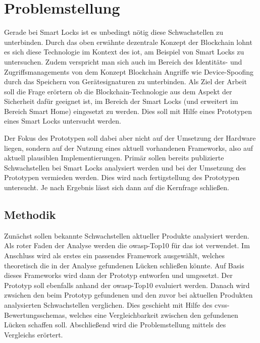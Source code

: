 \section*{Problemstellung}
    Gerade bei Smart Locks ist es unbedingt nötig diese Schwachstellen zu unterbinden.
    Durch das oben erwähnte dezentrale Konzept der Blockchain\cite{Nakamoto2008} lohnt es sich diese Technologie im Kontext des \gls{iot}, am Beispiel von Smart Locks zu untersuchen.
    Zudem verspricht man sich auch im Bereich des Identitäts- und Zugriffsmanagements von dem Konzept Blockchain Angriffe wie Device-Spoofing durch das Speichern von Gerätesignaturen zu unterbinden\cite{Kshetri2017}.
    \newline
    \noindent Als Ziel der Arbeit soll die Frage erörtern ob die Block\-chain\--Tech\-no\-lo\-gie aus dem Aspekt der Sicherheit dafür geeignet ist, im Bereich der Smart Locks (und erweitert im Bereich Smart Home) eingesetzt zu werden.
    Dies soll mit Hilfe eines Prototypen eines Smart Locks untersucht werden.
    
    Der Fokus des Prototypen soll dabei aber nicht auf der Umsetzung der Hardware liegen, sondern auf der Nutzung eines aktuell vorhandenen Frameworks, also auf aktuell plausiblen Implementierungen. 
    Primär sollen bereits publizierte Schwachstellen bei Smart Locks analysiert werden und bei der Umsetzung des Prototypen vermieden werden. 
    Dies wird nach fertigstellung des Prototypen untersucht.
    Je nach Ergebnis lässt sich dann auf die Kernfrage schließen.

    \subsection*{Methodik}
        Zunächst sollen bekannte Schwachstellen aktueller Produkte analysiert werden.
        Als roter Faden der Analyse werden die \gls{owasp}-Top10 für das \gls{iot}\cite{Miessler2015a} verwendet.
        Im Anschluss wird als erstes ein passendes Framework ausgewählt, welches theoretisch die in der Analyse gefundenen Lücken schließen könnte.
        Auf Basis dieses Frameworks wird dann der Prototyp entworfen und umgesetzt.
        Der Prototyp soll ebenfalls anhand der \gls{owasp}-Top10 evaluiert werden.
        Danach wird zwsichen den beim Prototyp gefundenen und den zuvor bei aktuellen Produkten analysierten Schwachstellen verglichen.
        Dies geschieht mit Hilfe des \gls{cvss}-Bewertungsschemas, welches eine Vergleichbarkeit zwischen den gefundenen Lücken schaffen soll.
        Abschließend wird die Problemstellung mittels des Vergleichs erörtert.


